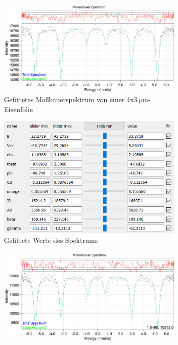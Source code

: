 \documentclass[german, %
parskip=full, %
bibliography=totoc, %
]{scrartcl}
\begin{document}
\begin{figure}[ht]
	\centering
	\begin{subfigure}[b]{0.5\textwidth}
		\includegraphics[width=\textwidth]{MoessbauerEisen4x3OhneAnpassung}
	  \caption{Gefittetes Mößbauerspektrum von einer 4x\(\SI{3}{\micro\meter}\)-Eisenfolie}
	  \label{fig:moess4x3oA}
  \end{subfigure}
  \begin{subfigure}[b]{0.4\textwidth}
	  \includegraphics[width=\textwidth]{WerteEisen4x3OhneAnpassung}
	  \caption{Gefittete Werte des Spektrums}
	  \label{fig:werte4x3oA}
  \end{subfigure}
	\begin{subfigure}[b]{0.5\textwidth}
		\includegraphics[width=\textwidth]{MoessbauerEisen25OhneAnpassung}

\end{subfigure}
\end{figure}
\end{document}
